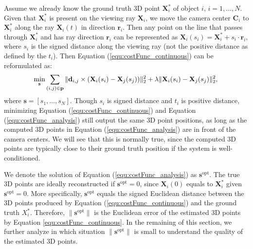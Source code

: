 Assume we already know the ground truth 3D point $\mathbf{{X}}_i^*$ of object $i$, $i=1,\dots,N$. Given that $\mathbf{{X}}_i^*$ is present on the viewing ray $\mathbf{X}_i$, we move the camera center $\mathbf{C}_i$ to $\mathbf{X}_i^*$ along the ray $\mathbf{X}_i(t)$ in direction $\mathbf{r}_i$. Then any point on the line that passes through $\mathbf{X}_i^*$ and has ray direction $\mathbf{r}_i$ can be represented as $\mathbf{X}_i (s_i)= \mathbf{X}_i^* + s_i \cdot \mathbf{r}_i$, where $s_i$ is the signed distance along the viewing ray (not the positive distance as defined by the $t_i$). Then Equation (\ref{equ:costFunc_continuous}) can be reformulated as:
\begin{equation}
\label{equ:costFunc_analysis}
\underset{\mathbf{s}} { \text{min} }
\sum_{(i,j)\in{\mathbf{p}}}{\|\mathbf{d}_{i,j}\times(\mathbf{X}_i(s_i)-\mathbf{X}_j(s_j))\|_2^2 + \lambda\|\mathbf{X}_i(s_i)-\mathbf{X}_j(s_j)\|_2^2}, \\
\end{equation}
where $\mathbf{s}=[s_1, \dots, s_N]$. Though $s_i$ is signed distance and $t_i$ is positive distance, minimizing Equation (\ref{equ:costFunc_continuous}) and Equation (\ref{equ:costFunc_analysis}) still output the same 3D point positions, as long as the computed 3D points in Equation (\ref{equ:costFunc_analysis}) are in front of the camera centers. We will see that this is normally true, since the computed 3D points are typically close to their ground truth position if the system is well-conditioned.

We denote the solution of Equation (\ref{equ:costFunc_analysis}) as $\mathbf{s}^\text{opt}$. The true 3D points are ideally reconstructed if $\mathbf{s}^\text{opt}=0$, since $\mathbf{X}_i(0)$ equals to $\mathbf{{X}}_i^*$ given $\mathbf{s}^\text{opt}=0$.
More specifically, $\mathbf{s}^\text{opt}$ equals the signed Euclidean distance between the 3D points produced by Equation (\ref{equ:costFunc_continuous}) and the ground truth $X_i^*$.
Therefore, $\|\mathbf{s}^\text{opt}\|$ is the Euclidean error of the estimated 3D points by Equation \ref{equ:costFunc_continuous}.
In the remaining of this section, we further analyze in which situation $\|\mathbf{s}^\text{opt}\|$ is small to understand the quality of the estimated 3D points. %

